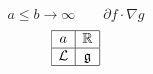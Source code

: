 \documentclass{article}
\begin{document}
\[ a \leq b \to \infty \qquad \partial f \cdot \nabla g \]
\[ \begin{array}{|c|c|} \hline a & \mathbb{R} \\ \hline \mathcal{L} & \mathfrak{g} \\ \hline \end{array} \]
\end{document}
